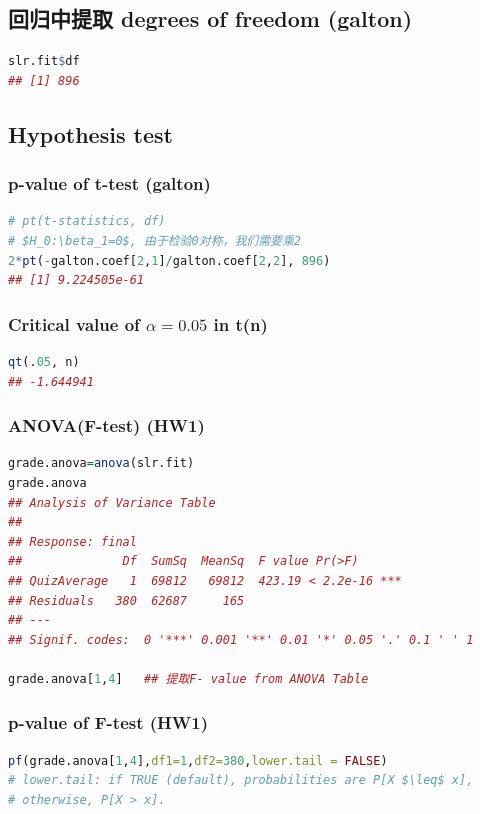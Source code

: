 \documentclass[11pt,a4paper]{article}
\begin{document}
\subsection{回归中提取 degrees of freedom (galton)}
\begin{lstlisting}[language=R]
slr.fit$df
## [1] 896
\end{lstlisting}












\subsection{Hypothesis test}
\subsubsection{p-value of t-test (galton)}
\begin{lstlisting}[language=R]
# pt(t-statistics, df)
# $H_0:\beta_1=0$, 由于检验0对称，我们需要乘2
2*pt(-galton.coef[2,1]/galton.coef[2,2], 896)
## [1] 9.224505e-61
\end{lstlisting}

\subsubsection{Critical value of $\alpha=0.05$ in t(n)}
\begin{lstlisting}[language=R]
qt(.05, n)
## -1.644941
\end{lstlisting}

\subsubsection{ANOVA(F-test) (HW1)}
\begin{lstlisting}[language=R]
grade.anova=anova(slr.fit)
grade.anova
## Analysis of Variance Table
##
## Response: final
##              Df  SumSq  MeanSq  F value Pr(>F)
## QuizAverage   1  69812   69812  423.19 < 2.2e-16 ***
## Residuals   380  62687     165
## ---
## Signif. codes:  0 '***' 0.001 '**' 0.01 '*' 0.05 '.' 0.1 ' ' 1

grade.anova[1,4]   ## 提取F- value from ANOVA Table
\end{lstlisting}

\subsubsection{p-value of F-test (HW1)}
\begin{lstlisting}[language=R]
pf(grade.anova[1,4],df1=1,df2=380,lower.tail = FALSE)
# lower.tail: if TRUE (default), probabilities are P[X $\leq$ x],
# otherwise, P[X > x].
\end{lstlisting}
\end{document}
